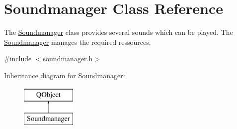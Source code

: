 \hypertarget{class_soundmanager}{}\section{Soundmanager Class Reference}
\label{class_soundmanager}


The \hyperlink{class_soundmanager}{Soundmanager} class provides several sounds which can be played.  The \hyperlink{class_soundmanager}{Soundmanager} manages the required ressources.  




{\ttfamily \#include $<$soundmanager.\+h$>$}

Inheritance diagram for Soundmanager\+:\begin{figure}[H]
\begin{center}
\leavevmode
\includegraphics[height=2.000000cm]{class_soundmanager}
\end{center}
\end{figure}
